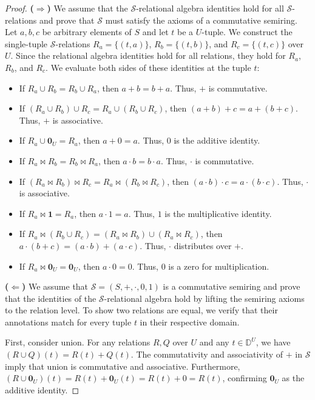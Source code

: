 \documentclass[oneside, 11pt]{amsbook}
\theoremstyle{plain}
\theoremstyle{definition}
\theoremstyle{remark}
\begin{document}
\begin{proof}
    \textbf{($\Rightarrow$)}
    We assume that the $\mathcal{S}$-relational algebra identities hold for all $\mathcal{S}$-relations and prove that $\mathcal{S}$ must satisfy the axioms of a commutative semiring. Let $a, b, c$ be arbitrary elements of $S$ and let $t$ be a $U$-tuple. We construct the single-tuple $\mathcal{S}$-relations $R_a = \{ (t, a) \}$, $R_b = \{ (t, b) \}$, and $R_c = \{ (t, c) \}$ over $U$. Since the relational algebra identities hold for all relations, they hold for $R_a$, $R_b$, and $R_c$. We evaluate both sides of these identities at the tuple $t$:
    \begin{itemize}
        \item If $R_a \cup R_b = R_b \cup R_a$, then $a + b = b + a$. Thus, $+$ is commutative.
        \item If $(R_a \cup R_b) \cup R_c = R_a \cup (R_b \cup R_c)$, then $(a + b) + c = a + (b + c)$. Thus, $+$ is associative.
        \item If $R_a \cup \mathbf{0}_U = R_a$, then $a + 0 = a$. Thus, $0$ is the additive identity.
        \item If $R_a \bowtie R_b = R_b \bowtie R_a$, then $a \cdot b = b \cdot a$. Thus, $\cdot$ is commutative.
        \item If $(R_a \bowtie R_b) \bowtie R_c = R_a \bowtie (R_b \bowtie R_c)$, then $(a \cdot b) \cdot c = a \cdot (b \cdot c)$. Thus, $\cdot$ is associative.
        \item If $R_a \bowtie \mathbf{1} = R_a$, then $a \cdot 1 = a$. Thus, $1$ is the multiplicative identity.
        \item If $R_a \bowtie (R_b \cup R_c) = (R_a \bowtie R_b) \cup (R_a \bowtie R_c)$, then $a \cdot (b + c) = (a \cdot b) + (a \cdot c)$. Thus, $\cdot$ distributes over $+$.
        \item If $R_a \bowtie \mathbf{0}_U = \mathbf{0}_U$, then $a \cdot 0 = 0$. Thus, $0$ is a zero for multiplication.
    \end{itemize}

    \textbf{($\Leftarrow$)}
    We assume that $\mathcal{S} = (S,+,\cdot,0,1)$ is a commutative semiring and prove that the identities of the $\mathcal{S}$-relational algebra hold by lifting the semiring axioms to the relation level. To show two relations are equal, we verify that their annotations match for every tuple $t$ in their respective domain.

    First, consider union. For any relations $R, Q$ over $U$ and any $t \in \mathbb{D}^U$, we have $(R \cup Q)(t) = R(t) + Q(t)$. The commutativity and associativity of $+$ in $\mathcal{S}$ imply that union is commutative and associative. Furthermore, $(R \cup \mathbf{0}_U)(t) = R(t) + \mathbf{0}_U(t) = R(t) + 0 = R(t)$, confirming $\mathbf{0}_U$ as the additive identity.


\end{proof}
\end{document}

